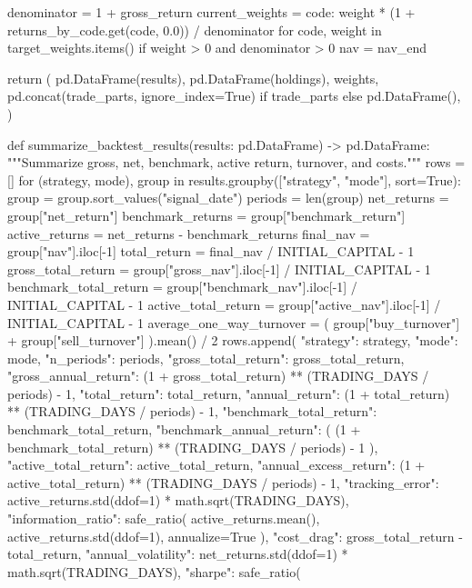 \documentclass[UTF8,a4paper,fontset=fandol]{ctexart}
\begin{document}
\begin{ProjectCode}
        denominator = 1 + gross_return
        current_weights = {
            code: weight * (1 + returns_by_code.get(code, 0.0)) / denominator
            for code, weight in target_weights.items()
            if weight > 0 and denominator > 0
        }
        nav = nav_end

    return (
        pd.DataFrame(results),
        pd.DataFrame(holdings),
        weights,
        pd.concat(trade_parts, ignore_index=True) if trade_parts else pd.DataFrame(),
    )


def summarize_backtest_results(results: pd.DataFrame) -> pd.DataFrame:
    """Summarize gross, net, benchmark, active return, turnover, and costs."""
    rows = []
    for (strategy, mode), group in results.groupby(["strategy", "mode"], sort=True):
        group = group.sort_values("signal_date")
        periods = len(group)
        net_returns = group["net_return"]
        benchmark_returns = group["benchmark_return"]
        active_returns = net_returns - benchmark_returns
        final_nav = group["nav"].iloc[-1]
        total_return = final_nav / INITIAL_CAPITAL - 1
        gross_total_return = group["gross_nav"].iloc[-1] / INITIAL_CAPITAL - 1
        benchmark_total_return = group["benchmark_nav"].iloc[-1] / INITIAL_CAPITAL - 1
        active_total_return = group["active_nav"].iloc[-1] / INITIAL_CAPITAL - 1
        average_one_way_turnover = (
            group["buy_turnover"] + group["sell_turnover"]
        ).mean() / 2
        rows.append({
            "strategy": strategy,
            "mode": mode,
            "n_periods": periods,
            "gross_total_return": gross_total_return,
            "gross_annual_return": (1 + gross_total_return) ** (TRADING_DAYS / periods) - 1,
            "total_return": total_return,
            "annual_return": (1 + total_return) ** (TRADING_DAYS / periods) - 1,
            "benchmark_total_return": benchmark_total_return,
            "benchmark_annual_return": (
                (1 + benchmark_total_return) ** (TRADING_DAYS / periods) - 1
            ),
            "active_total_return": active_total_return,
            "annual_excess_return": (1 + active_total_return) ** (TRADING_DAYS / periods) - 1,
            "tracking_error": active_returns.std(ddof=1) * math.sqrt(TRADING_DAYS),
            "information_ratio": safe_ratio(
                active_returns.mean(), active_returns.std(ddof=1), annualize=True
            ),
            "cost_drag": gross_total_return - total_return,
            "annual_volatility": net_returns.std(ddof=1) * math.sqrt(TRADING_DAYS),
            "sharpe": safe_ratio(
}
\end{ProjectCode}
\end{document}
